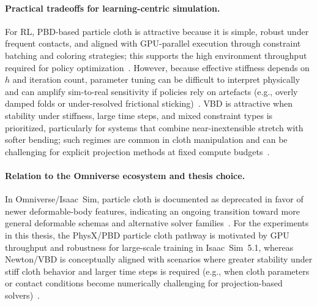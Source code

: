 \paragraph{Practical tradeoffs for learning-centric simulation.}
For \ac{RL}, \ac{PBD}-based particle cloth is attractive because it is simple, robust under
frequent contacts, and aligned with \ac{GPU}-parallel execution through constraint batching
and coloring strategies; this supports the high environment throughput required for policy
optimization~\cite{omni_physics_particles,FratarcangeliPellacini2013GPUPBD,Makoviychuk2021IsaacGym}.
However, because effective stiffness depends on $h$ and iteration count, parameter tuning
can be difficult to interpret physically and can amplify sim-to-real sensitivity if policies rely
on artefacts (e.g., overly damped folds or under-resolved frictional sticking)~\cite{macklin2016xpbd,Salvato2021RealityGapSurvey}.
\ac{VBD} is attractive when stability under stiffness, large time steps, and mixed constraint
types is prioritized, particularly for systems that combine near-inextensible stretch with
softer bending; such regimes are common in cloth manipulation and can be challenging for
explicit projection methods at fixed compute budgets~\cite{Chen2024VBD,nvidia_isaaclab_newton_blog_2025}.

\paragraph{Relation to the Omniverse ecosystem and thesis choice.}
In Omniverse/Isaac~Sim, particle cloth is documented as deprecated in favor of newer
deformable-body features, indicating an ongoing transition toward more general deformable
schemas and alternative solver families~\cite{omni_physics_particles,isaac_sim_physics_resources_510}.
For the experiments in this thesis, the PhysX/\ac{PBD} particle cloth pathway is motivated
by \ac{GPU} throughput and robustness for large-scale training in Isaac~Sim~5.1, whereas
Newton/\ac{VBD} is conceptually aligned with scenarios where greater stability under stiff
cloth behavior and larger time steps is required (e.g., when cloth parameters or contact
conditions become numerically challenging for projection-based solvers)~\cite{omni_physics_particles,Chen2024VBD,nvidia_isaaclab_newton_blog_2025}.

